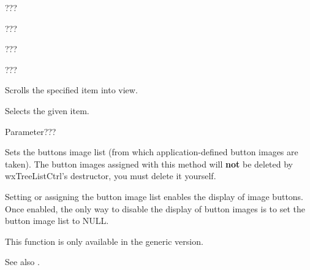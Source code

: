 ???

\label{wxtreelistctrlsetfont}


???

\label{wxtreelistctrlsetforegroundcolour}


???

\label{wxtreelistctrlsetwindowstyle}


???

\label{wxtreelistctrlscrollto}


Scrolls the specified item into view.

\label{wxtreelistctrlselectitem}


Selects the given item.

Parameter???

\label{wxtreelistctrlsetbuttonsimagelist}


Sets the buttons image list (from which application-defined button images are taken).
The button images assigned with this method will
{\bf not} be deleted by wxTreeListCtrl's destructor, you must delete it yourself.

Setting or assigning the button image list enables the display of image buttons.
Once enabled, the only way to disable the display of button images is to set
the button image list to NULL.

This function is only available in the generic version.

See also .

\label{wxtreelistctrlsetimagelist}

